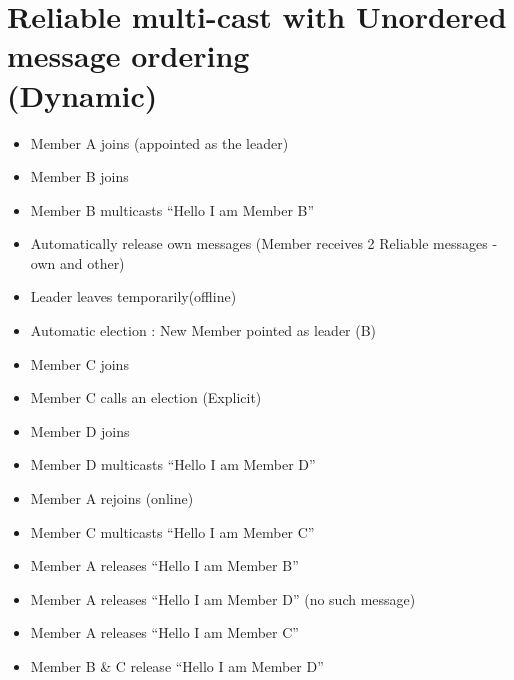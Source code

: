 \documentclass[a4,12pt]{article}
\begin{document}
\section*{Reliable multi-cast with Unordered message ordering\\(Dynamic)}
\begin{itemize}\itemsep 2pt \parskip 1pt \parsep 2pt
\item Member A joins (appointed as the leader)
\item Member B joins
\item Member B multicasts “Hello I am Member B”
\item Automatically release own messages (Member receives 2 Reliable messages - own and other)
\item Leader leaves temporarily(offline)
\item Automatic election : New Member pointed as leader (B)
\item Member C joins
\item Member C calls an election (Explicit)
\item Member D joins
\item Member D multicasts “Hello I am Member D” 
\item Member A rejoins (online)
\item Member C multicasts “Hello I am Member C” 
\item Member A releases “Hello I am Member B” 
\item Member A releases “Hello I am Member D” (no such message)
\item Member A releases “Hello I am Member C” 
\item Member B \& C  release “Hello I am Member D” 
\end{itemize}
\end{document}
